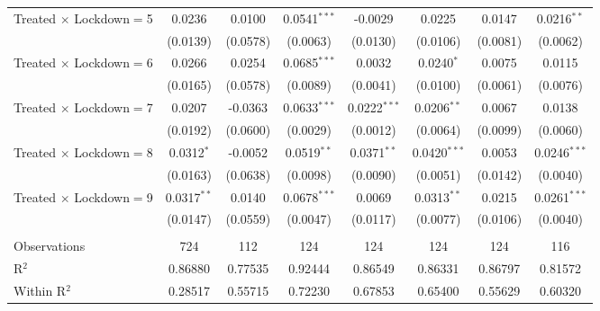 \begin{tabular}{lccccccc}
   Treated $\times$ Lockdown$=$5  & 0.0236        & 0.0100        & 0.0541$^{***}$  & -0.0029         & 0.0225                 & 0.0147        & 0.0216$^{**}$\\
                                   & (0.0139)      & (0.0578)      & (0.0063)        & (0.0130)        & (0.0106)               & (0.0081)      & (0.0062)\\
   Treated $\times$ Lockdown$=$6  & 0.0266        & 0.0254        & 0.0685$^{***}$  & 0.0032          & 0.0240$^{*}$           & 0.0075        & 0.0115\\
                                   & (0.0165)      & (0.0578)      & (0.0089)        & (0.0041)        & (0.0100)               & (0.0061)      & (0.0076)\\
   Treated $\times$ Lockdown$=$7  & 0.0207        & -0.0363       & 0.0633$^{***}$  & 0.0222$^{***}$  & 0.0206$^{**}$          & 0.0067        & 0.0138\\
                                   & (0.0192)      & (0.0600)      & (0.0029)        & (0.0012)        & (0.0064)               & (0.0099)      & (0.0060)\\
   Treated $\times$ Lockdown$=$8  & 0.0312$^{*}$  & -0.0052       & 0.0519$^{**}$   & 0.0371$^{**}$   & 0.0420$^{***}$         & 0.0053        & 0.0246$^{***}$\\
                                   & (0.0163)      & (0.0638)      & (0.0098)        & (0.0090)        & (0.0051)               & (0.0142)      & (0.0040)\\
   Treated $\times$ Lockdown$=$9  & 0.0317$^{**}$ & 0.0140        & 0.0678$^{***}$  & 0.0069          & 0.0313$^{**}$          & 0.0215        & 0.0261$^{***}$\\
                                   & (0.0147)      & (0.0559)      & (0.0047)        & (0.0117)        & (0.0077)               & (0.0106)      & (0.0040)\\
                                   &               &               &                 &                 &                        &               &  \\
   Observations                    & 724           & 112           & 124             & 124             & 124                    & 124           & 116\\
   R$^2$                           & 0.86880       & 0.77535       & 0.92444         & 0.86549         & 0.86331                & 0.86797       & 0.81572\\
   Within R$^2$                    & 0.28517       & 0.55715       & 0.72230         & 0.67853         & 0.65400                & 0.55629       & 0.60320\\

\end{tabular}
